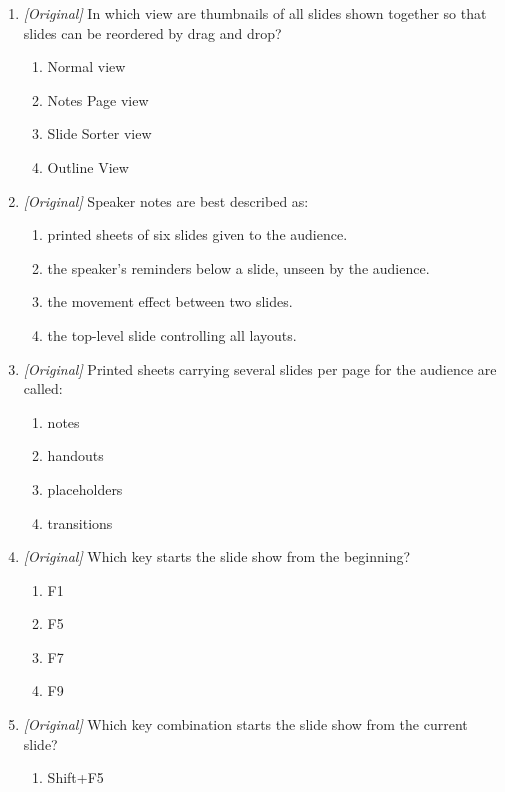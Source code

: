 \documentclass[11pt]{article}
\begin{document}
\begin{enumerate}[label=\textbf{Q\arabic*.}, leftmargin=*]
\begin{enumerate}[label=\Alph*.]
    \item Normal view
    \item Slide Show view
  \end{enumerate}
\item \textit{[Original]} In which view are thumbnails of all slides shown
  together so that slides can be reordered by drag and drop?
  \begin{enumerate}[label=\Alph*.]
    \item Normal view
    \item Notes Page view
    \item Slide Sorter view
    \item Outline View
  \end{enumerate}
\item \textit{[Original]} Speaker notes are best described as:
  \begin{enumerate}[label=\Alph*.]
    \item printed sheets of six slides given to the audience.
    \item the speaker's reminders below a slide, unseen by the audience.
    \item the movement effect between two slides.
    \item the top-level slide controlling all layouts.
  \end{enumerate}
\item \textit{[Original]} Printed sheets carrying several slides per page for
  the audience are called:
  \begin{enumerate}[label=\Alph*.]
    \item notes
    \item handouts
    \item placeholders
    \item transitions
  \end{enumerate}
\item \textit{[Original]} Which key starts the slide show from the beginning?
  \begin{enumerate}[label=\Alph*.]
    \item F1
    \item F5
    \item F7
    \item F9
  \end{enumerate}
\item \textit{[Original]} Which key combination starts the slide show from
  the current slide?
  \begin{enumerate}[label=\Alph*.]
    \item Shift+F5

\end{enumerate}
\end{enumerate}
\end{document}
